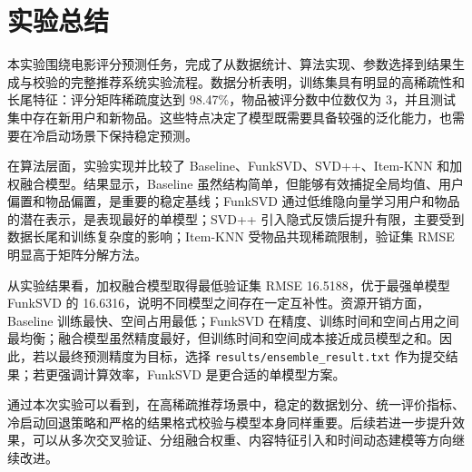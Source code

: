 \documentclass[UTF8,a4paper,10pt]{ctexart}
\begin{document}
\section{实验总结}

本实验围绕电影评分预测任务，完成了从数据统计、算法实现、参数选择到结果生成与校验的完整推荐系统实验流程。数据分析表明，训练集具有明显的高稀疏性和长尾特征：评分矩阵稀疏度达到 98.47\%，物品被评分数中位数仅为 3，并且测试集中存在新用户和新物品。这些特点决定了模型既需要具备较强的泛化能力，也需要在冷启动场景下保持稳定预测。

在算法层面，实验实现并比较了 Baseline、FunkSVD、SVD++、Item-KNN 和加权融合模型。结果显示，Baseline 虽然结构简单，但能够有效捕捉全局均值、用户偏置和物品偏置，是重要的稳定基线；FunkSVD 通过低维隐向量学习用户和物品的潜在表示，是表现最好的单模型；SVD++ 引入隐式反馈后提升有限，主要受到数据长尾和训练复杂度的影响；Item-KNN 受物品共现稀疏限制，验证集 RMSE 明显高于矩阵分解方法。

从实验结果看，加权融合模型取得最低验证集 RMSE 16.5188，优于最强单模型 FunkSVD 的 16.6316，说明不同模型之间存在一定互补性。资源开销方面，Baseline 训练最快、空间占用最低；FunkSVD 在精度、训练时间和空间占用之间最均衡；融合模型虽然精度最好，但训练时间和空间成本接近成员模型之和。因此，若以最终预测精度为目标，选择 \texttt{results/ensemble\_result.txt} 作为提交结果；若更强调计算效率，FunkSVD 是更合适的单模型方案。

通过本次实验可以看到，在高稀疏推荐场景中，稳定的数据划分、统一评价指标、冷启动回退策略和严格的结果格式校验与模型本身同样重要。后续若进一步提升效果，可以从多次交叉验证、分组融合权重、内容特征引入和时间动态建模等方向继续改进。


\newpage


\end{document}
